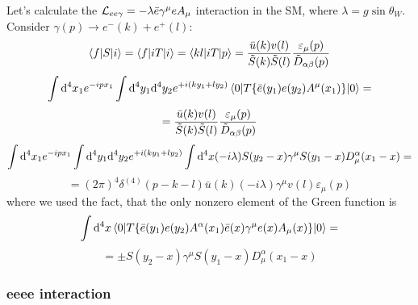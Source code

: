 Let's calculate the ${\mathcal L}_{ee\gamma}=-\lambda \bar e\gamma^\mu e A_\mu$ interaction in the SM, where $\lambda=g\sin\theta_W$. Consider $\gamma(p)\to e^-(k)+e^+(l)$: 
\begin{equation*}
  \mathinner{\langle{f|S|i}\rangle}= \mathinner{\langle{f|iT|i}\rangle}= \mathinner{\langle{k l|iT|p}\rangle}= {\bar u(k) v(l)\over\tilde S(k)\tilde S(l)} {\varepsilon_\mu(p)\over\tilde D_{\alpha\beta}(p)}
\end{equation*}
\begin{equation*}
  \int{\rm d}^4 x_1 e^{-i p x_1} \int{\rm d}^4 y_1 {\rm d}^4 y_2 e^{+i(k y_1+l y_2)} \mathinner{\langle{0|T\{\bar e(y_1) e(y_2) A^\mu(x_1)\}|0}\rangle} =
\end{equation*}
\begin{equation*}
  = {\bar u(k) v(l)\over\tilde S(k)\tilde S(l)} {\varepsilon_\mu(p)\over\tilde D_{\alpha\beta}(p)}
\end{equation*}
\begin{equation*}
  \int{\rm d}^4 x_1 e^{-i p x_1} \int{\rm d}^4 y_1 {\rm d}^4 y_2 e^{+i(k y_1+l y_2)}\int{\rm d}^4 x (-i\lambda) S(y_2-x) \gamma^\mu S(y_1-x) D^\alpha_\mu(x_1-x) =
\end{equation*}
\begin{equation*}
  =(2\pi)^4\delta^{(4)}(p-k-l)\bar u(k)(-i\lambda)\gamma^\mu v(l)\varepsilon_\mu(p)
\end{equation*}
where we used the fact, that the only nonzero element of the Green function is 
\begin{equation*}
  \int{\rm d}^4 x \mathinner{\langle{0|T\{\bar e(y_1) e(y_2) A^\alpha(x_1)\bar e(x)\gamma^\mu e(x) A_\mu(x)\}|0}\rangle} =
\end{equation*}
\begin{equation*}
  =\pm S(y_2-x) \gamma^\mu S(y_1-x) D^\alpha_\mu(x_1-x)
\end{equation*}

\subsubsection{eeee interaction}

